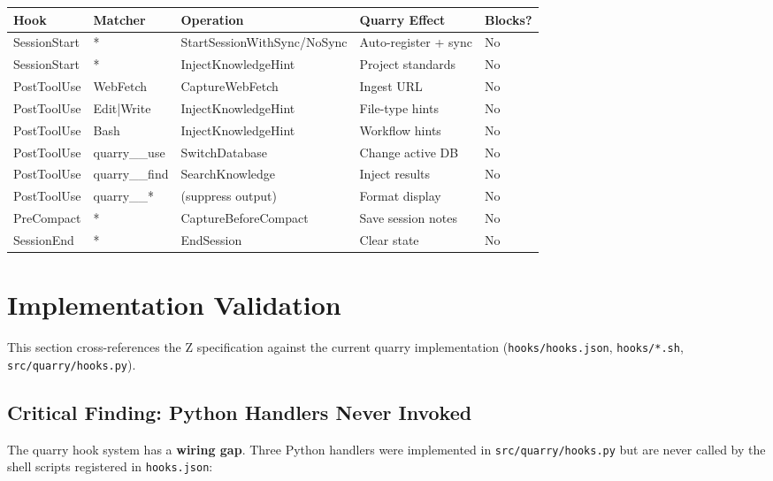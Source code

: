 \documentclass[a4paper,10pt,fleqn]{article}
\begin{document}
\begin{tabular}{lllll}
\hline
\textbf{Hook} & \textbf{Matcher} & \textbf{Operation} & \textbf{Quarry Effect} & \textbf{Blocks?} \\
\hline
SessionStart & * & StartSessionWithSync/NoSync & Auto-register + sync & No \\
SessionStart & * & InjectKnowledgeHint & Project standards & No \\
PostToolUse & WebFetch & CaptureWebFetch & Ingest URL & No \\
PostToolUse & Edit|Write & InjectKnowledgeHint & File-type hints & No \\
PostToolUse & Bash & InjectKnowledgeHint & Workflow hints & No \\
PostToolUse & quarry\_\_use & SwitchDatabase & Change active DB & No \\
PostToolUse & quarry\_\_find & SearchKnowledge & Inject results & No \\
PostToolUse & quarry\_\_* & (suppress output) & Format display & No \\
PreCompact & * & CaptureBeforeCompact & Save session notes & No \\
SessionEnd & * & EndSession & Clear state & No \\
\hline
\end{tabular}

\section{Implementation Validation}

This section cross-references the Z specification against the
current quarry implementation (\texttt{hooks/hooks.json},
\texttt{hooks/*.sh}, \texttt{src/quarry/hooks.py}).

\subsection{Critical Finding: Python Handlers Never Invoked}

The quarry hook system has a \textbf{wiring gap}. Three Python
handlers were implemented in \texttt{src/quarry/hooks.py} but are
never called by the shell scripts registered in \texttt{hooks.json}:
\end{document}
